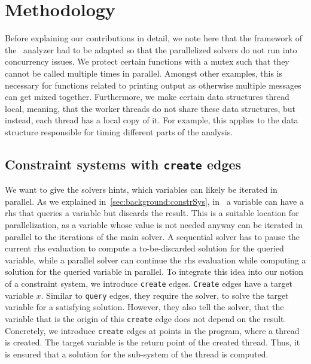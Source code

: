 \section{Methodology}
\label{sec:method}
Before explaining our contributions in detail, we note here that the framework of the \gob\ analyzer had to be adapted so that the parallelized solvers do not run into concurrency issues. We protect certain functions with a mutex such that they cannot be called multiple times in parallel. Amongst other examples, this is necessary for functions related to printing output as otherwise multiple messages can get mixed together. Furthermore, we make certain data structures thread local, meaning, that the worker threads do not share these data structures, but instead, each thread has a local copy of it. For example, this applies to the data structure responsible for timing different parts of the analysis.

  \subsection{Constraint systems with \texttt{create} edges}
  \label{sec:method:create}
  We want to give the solvers hints, which variables can likely be iterated in parallel. As we explained in~\autoref{sec:background:constrSys}, in \gob\ a variable can have a \ac{rhs} that queries a variable but discards the result. This is a suitable location for parallelization, as a variable whose value is not needed anyway can be iterated in parallel to the iterations of the main solver. A sequential solver has to pause the current \ac{rhs} evaluation to compute a to-be-discarded solution for the queried variable, while a parallel solver can continue the \ac{rhs} evaluation while computing a solution for the queried variable in parallel.
  To integrate this idea into our notion of a constraint system, we introduce \texttt{create} edges. \texttt{Create} edges have a target variable $x$. Similar to \texttt{query} edges, they require the solver, to solve the target variable for a satisfying solution. However, they also tell the solver, that the variable that is the origin of this \texttt{create} edge does not depend on the result. Concretely, we introduce \texttt{create} edges at points in the program, where a thread is created. The target variable is the return point of the created thread. Thus, it is ensured that a solution for the sub-system of the thread is computed.

